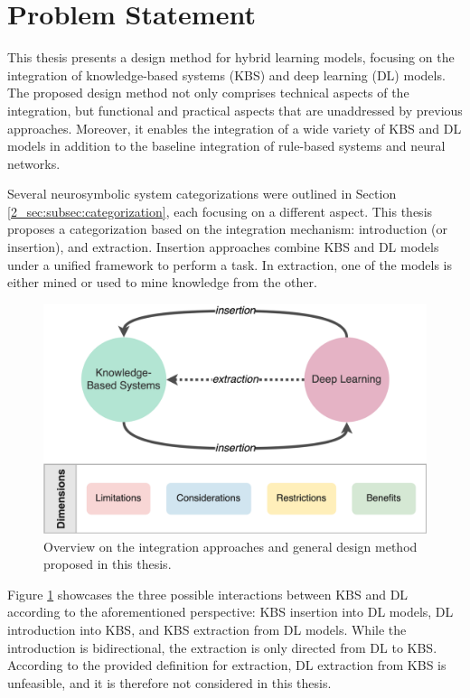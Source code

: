 \section{Problem Statement} \label{3_sec:problem_statement}
This thesis presents a design method for hybrid learning models, focusing on the integration of knowledge-based systems (KBS) and deep learning (DL) models. The proposed design method not only comprises technical aspects of the integration, but functional and practical aspects that are unaddressed by previous approaches.  Moreover, it enables the integration of a wide variety of KBS and DL models in addition to the baseline integration of rule-based systems and neural networks.  

Several neurosymbolic system categorizations were outlined in Section \ref{2_sec:subsec:categorization}, each focusing on a different aspect. This thesis proposes a categorization based on the integration mechanism: introduction (or insertion), and extraction. Insertion approaches combine KBS and DL models under a unified framework to perform a task. In extraction, one of the models is either mined or used to mine knowledge from the other. 

\begin{figure}[t]
    \centering
    \includegraphics[width=.85\linewidth]{3_objectives/figures/overview_method.eps}
    \caption{Overview on the integration approaches and general design method proposed in this thesis.}
    \label{fig:thesis_overview}
\end{figure}

Figure \ref{fig:thesis_overview} showcases the three possible interactions between KBS and DL according to the aforementioned perspective: KBS insertion into DL models, DL introduction into KBS, and KBS extraction from DL models. While the introduction is bidirectional, the extraction is only directed from DL to KBS. According to the provided definition for extraction, DL extraction from KBS is unfeasible, and it is therefore not considered in this thesis. 

